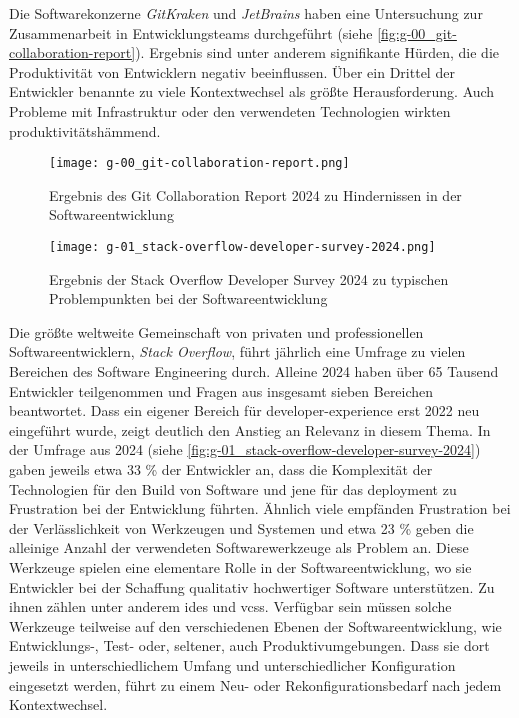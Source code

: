 Die Softwarekonzerne \textit{GitKraken} und \textit{JetBrains} haben eine Untersuchung zur Zusammenarbeit in Entwicklungsteams durchgeführt (siehe \autoref{fig:g-00_git-collaboration-report}). Ergebnis sind unter anderem signifikante Hürden, die die Produktivität von Entwicklern negativ beeinflussen. Über ein Drittel der Entwickler benannte zu viele Kontextwechsel als größte Herausforderung. Auch Probleme mit Infrastruktur oder den verwendeten Technologien wirkten produktivitätshämmend. \cite{213:2024-State-of-Git-Collaboration}

\pagebreak[4]

\begin{figure}[h]
    \centering
    \begin{minipage}[b]{0.39\textwidth}
        \centering
        \texttt{[image: g-00\_git-collaboration-report.png]}
        \caption{Ergebnis des Git Collaboration Report 2024 zu Hindernissen in der Softwareentwicklung \cite{213:2024-State-of-Git-Collaboration}}
        \label{fig:g-00_git-collaboration-report}
    \end{minipage}
    \hfill
    \begin{minipage}[b]{0.59\textwidth}
        \centering
        \texttt{[image: g-01\_stack-overflow-developer-survey-2024.png]}
        \caption{Ergebnis der Stack Overflow Developer Survey 2024 zu typischen Problempunkten bei der Softwareentwicklung \cite{212:Developer-Survey}}
        \label{fig:g-01_stack-overflow-developer-survey-2024}
    \end{minipage}
\end{figure}

Die größte weltweite Gemeinschaft von privaten und professionellen Softwareentwicklern, \textit{Stack Overflow}, führt jährlich eine Umfrage zu vielen Bereichen des Software Engineering durch. Alleine 2024 haben über 65 Tausend Entwickler teilgenommen und Fragen aus insgesamt sieben Bereichen beantwortet. Dass ein eigener Bereich für \Gls{developer-experience} erst 2022 neu eingeführt wurde, zeigt deutlich den Anstieg an Relevanz in diesem Thema. \cite{212:Developer-Survey} In der Umfrage aus 2024 (siehe \autoref{fig:g-01_stack-overflow-developer-survey-2024}) gaben jeweils etwa 33 \% der Entwickler an, dass die Komplexität der Technologien für den Build von Software und jene für das \Gls{deployment} zu Frustration bei der Entwicklung führten. Ähnlich viele empfänden Frustration bei der Verlässlichkeit von Werkzeugen und Systemen und etwa 23 \% geben die alleinige Anzahl der verwendeten Softwarewerkzeuge als Problem an. \cite{206:Developer-Survey-2024} Diese Werkzeuge spielen eine elementare Rolle in der Softwareentwicklung, wo sie Entwickler bei der Schaffung qualitativ hochwertiger Software unterstützen. Zu ihnen zählen unter anderem \glspl{ide} und \glspl{vcs}. \cite{014:Managing-Container-based-Software-Development-Environments} Verfügbar sein müssen solche Werkzeuge teilweise auf den verschiedenen Ebenen der Softwareentwicklung, wie Entwicklungs-, Test- oder, seltener, auch Produktivumgebungen. Dass sie dort jeweils in unterschiedlichem Umfang und unterschiedlicher Konfiguration eingesetzt werden, führt zu einem Neu- oder Rekonfigurationsbedarf nach jedem Kontextwechsel. \cite{003:Infrastructure-from-Code}

